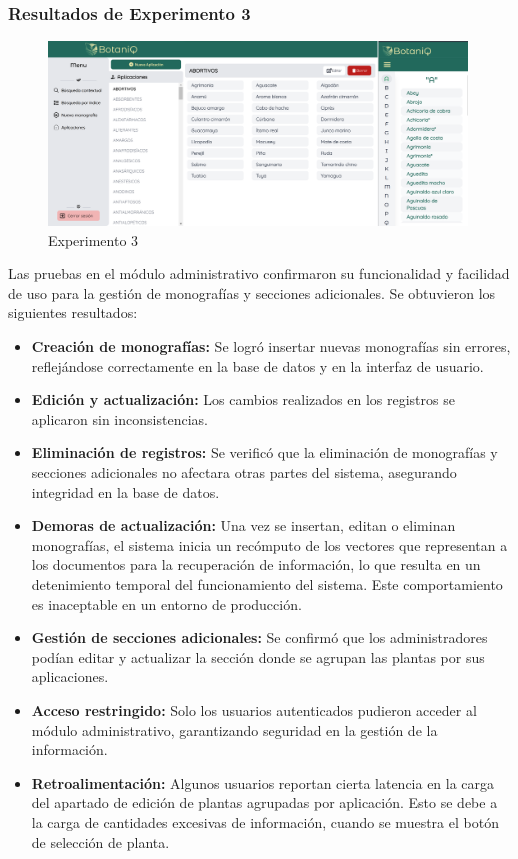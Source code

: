 \subsubsection*{Resultados de Experimento 3}
\begin{figure}[ht!]
    \centering
    \includegraphics[width=0.99\textwidth]{Images/exp3.png}
    \caption{Experimento 3}
    \label{fig:exp3}
\end{figure}
Las pruebas en el módulo administrativo confirmaron su funcionalidad y facilidad de uso para la gestión de monografías y secciones adicionales. 
Se obtuvieron los siguientes resultados:
\begin{itemize}
    \item \textbf{Creación de monografías:} Se logró insertar nuevas monografías sin errores, reflejándose correctamente en la base de datos 
    y en la interfaz de usuario.
    \item \textbf{Edición y actualización:} Los cambios realizados en los registros se aplicaron sin inconsistencias.
    \item \textbf{Eliminación de registros:} Se verificó que la eliminación de monografías y secciones adicionales no afectara otras partes 
    del sistema, asegurando integridad en la base de datos.
    \item \textbf{Demoras de actualización:} Una vez se insertan, editan o eliminan monografías, el sistema inicia un recómputo de los 
    vectores que representan a los documentos para la recuperación de información, lo que resulta en un detenimiento temporal del funcionamiento
    del sistema. Este comportamiento es inaceptable en un entorno de producción.
    \item \textbf{Gestión de secciones adicionales:} Se confirmó que los administradores podían editar y actualizar la sección donde se agrupan
    las plantas por sus aplicaciones.
    \item \textbf{Acceso restringido:} Solo los usuarios autenticados pudieron acceder al módulo administrativo, garantizando seguridad en la 
    gestión de la información.
    \item \textbf{Retroalimentación:} Algunos usuarios reportan cierta latencia en la carga del apartado de edición de plantas agrupadas por
    aplicación. Esto se debe a la carga de cantidades excesivas de información, cuando se muestra el botón de selección de planta.
\end{itemize}


